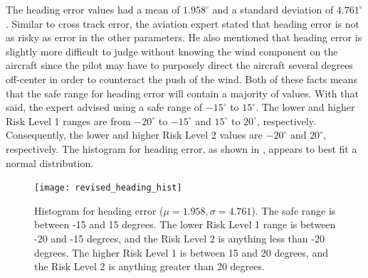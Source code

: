     	The heading error values had a mean of $1.958^\circ$ and a standard deviation of $4.761^\circ$.  Similar to cross track error, the aviation expert stated that heading error is not as risky as error in the other parameters.  He also mentioned that heading error is slightly more difficult to judge without knowing the wind component on the aircraft since the pilot may have to purposely direct the aircraft several degrees off-center in order to counteract the push of the wind.  Both of these facts means that the safe range for heading error will contain a majority of values.  With that said, the expert advised using a safe range of $-15^\circ$ to $15^\circ$.  The lower and higher Risk Level 1 ranges are from $-20^\circ$ to $-15^\circ$ and $15^\circ$ to $20^\circ$, respectively.  Consequently, the lower and higher Risk Level 2 values are $-20^\circ$ and $20^\circ$, respectively.  The histogram for heading error, as shown in , appears to best fit a normal distribution.
        
        \begin{figure}
			\centering
            \texttt{[image: revised\_heading\_hist]}
            \caption{Histogram for heading error ($\mu = 1.958, \sigma = 4.761$).  The safe range is between -15 and 15 degrees.  The lower Risk Level 1 range is between -20 and -15 degrees, and the Risk Level 2 is anything less than -20 degrees.  The higher Risk Level 1 is between 15 and 20 degrees, and the Risk Level 2 is anything greater than 20 degrees.}
            \label{fig:revised_heading_hist}
		\end{figure}
        
        
        
